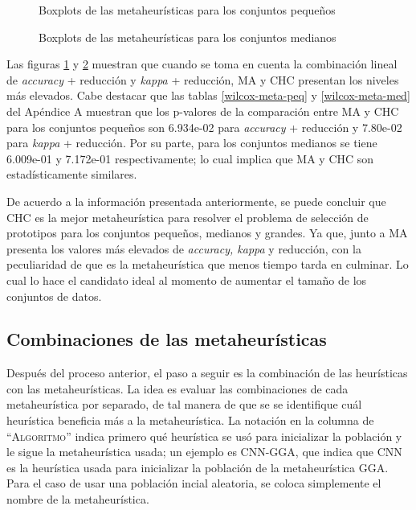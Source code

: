 \begin{figure}[h!]

	\centering

\caption{Boxplots de las metaheurísticas para los conjuntos pequeños}
\label{small-heuristics}
\end{figure}

\begin{figure}[h!]

	\centering

\caption{Boxplots de las metaheurísticas para los conjuntos medianos}
\label{medium-heuristics}
\end{figure}

Las figuras \ref{small-heuristics} y \ref{medium-heuristics} muestran que cuando se toma en cuenta la combinación lineal de \emph{accuracy} + reducción y \emph{kappa} + reducción, MA y CHC presentan los niveles más elevados. Cabe destacar que las tablas \ref{wilcox-meta-peq} y \ref{wilcox-meta-med} del Apéndice A muestran que los p-valores de la comparación entre MA y CHC para los conjuntos pequeños son 6.934e-02 para \emph{accuracy} + reducción y  7.80e-02 para \emph{kappa} + reducción. Por su parte, para los conjuntos medianos se tiene 6.009e-01 y 7.172e-01 respectivamente; lo cual implica que MA y CHC son estadísticamente similares. 

De acuerdo a la información presentada anteriormente, se puede concluir que CHC es la mejor metaheurística para resolver el problema de selección de prototipos para los conjuntos pequeños, medianos y grandes. Ya que, junto a MA presenta los valores más elevados de \emph{accuracy, kappa} y reducción, con la peculiaridad de que es la metaheurística que menos tiempo tarda en culminar. Lo cual lo hace el candidato ideal al momento de aumentar el tamaño de los conjuntos de datos.  

\subsection{Combinaciones de las metaheurísticas}

Después del proceso anterior, el paso a seguir es la combinación de las heurísticas con las metaheurísticas. La idea es evaluar las combinaciones de cada metaheurística por separado, de tal manera de que se se identifique cuál heurística beneficia más a la metaheurística. La notación en la columna de ``\textsc{Algoritmo}'' indica primero qué heurística se usó para inicializar la población y le sigue la metaheurística usada; un ejemplo es CNN-GGA, que indica que CNN es la heurística usada para inicializar la población de la metaheurística GGA. Para el caso de usar una población incial aleatoria, se coloca simplemente el nombre de la metaheurística.


